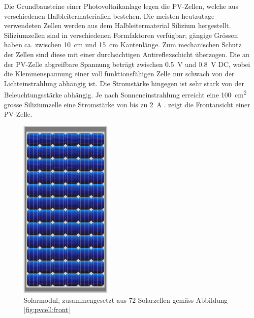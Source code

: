 Die   Grundbausteine    einer   Photovoltaikanlage   legen    die   PV-Zellen,
welche   aus   verschiedenen   Halbleitermaterialien   bestehen. Die   meisten
heutzutage  verwendeten  Zellen  werden aus  dem  Halbleitermaterial  Silizium
hergestellt. Siliziumzellen  sind in  verschiedenen Formfaktoren  verf\"ugbar;
g\"angige   Gr\"ossen    haben   ca.   zwischen    \SI{10}{\centi\meter}   und
\SI{15}{\centi\meter}  Kantenl\"ange.   Zum  mechanischen  Schutz  der  Zellen
sind  diese mit  einer durchsichtigen  Antireflexschicht \"uberzogen.   Die an
der  PV-Zelle  abgreifbare  Spannung betr\"agt  zwischen  \SI{0.5}{\volt}  und
\SI{0.8}{\volt} DC,  wobei die  Klemmenspannung einer  voll funktionsf\"ahigen
Zelle nur schwach von  der Lichteinstrahlung abh\"angig ist. Die Stromst\"arke
hingegen   ist  sehr   stark  von   der  Beleuchtungsst\"arke   abh\"angig. Je
nach    Sonneneinstrahlung   erreicht    eine   \SI{100}{\centi\meter\squared}
grosse   Siliziumzelle  eine   Stromst\"arke   von   bis  zu   \SI{2}{\ampere}
\cite{ref:pv:gesellschaftFuerSonnenenergie}.  zeigt die
Frontansicht einer PV-Zelle.

\clearpage
\begin{figure}
    \centering
    \includegraphics[width=0.4\textwidth]{images/solar-facility/pvmodule.jpeg}
    \caption[Bild eines PV-Moduls]
    {%
        Solarmodul,  zusammengesetzt  aus  72 Solarzellen  gem\"ass  Abbildung
        \ref{fig:pvcell:front}%
    }
    \label{fig:pvmodule}
    \vspace*{-1em}
\end{figure}


